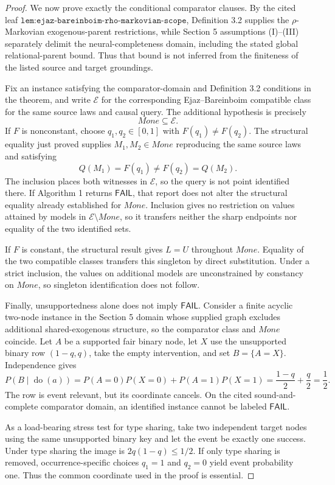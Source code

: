 \documentclass{article}
\begin{document}
\begin{proof}
We now prove exactly the conditional comparator clauses.  By the cited leaf \(\texttt{lem:ejaz-bareinboim-rho-markovian-scope}\), Definition 3.2 supplies the \(\rho\)-Markovian exogenous-parent restrictions, while Section 5 assumptions (I)--(III) separately delimit the neural-completeness domain, including the stated global relational-parent bound.  Thus that bound is not inferred from the finiteness of the listed source and target groundings.

Fix an instance satisfying the comparator-domain and Definition 3.2 conditions in the theorem, and write \(\mathcal E\) for the corresponding Ejaz--Bareinboim compatible class for the same source laws and causal query.  The additional hypothesis is precisely
\[
 Mone\subseteq\mathcal E.
\]
If \(F\) is nonconstant, choose \(q_1,q_2\in[0,1]\) with \(F(q_1)\neq F(q_2)\).  The structural equality just proved supplies \(M_1,M_2\in Mone\) reproducing the same source laws and satisfying
\[
 Q(M_1)=F(q_1)\neq F(q_2)=Q(M_2).
\]
The inclusion places both witnesses in \(\mathcal E\), so the query is not point identified there.  If Algorithm 1 returns \(\mathsf{FAIL}\), that report does not alter the structural equality already established for \(Mone\).  Inclusion gives no restriction on values attained by models in \(\mathcal E\setminus Mone\), so it transfers neither the sharp endpoints nor equality of the two identified sets.

If \(F\) is constant, the structural result gives \(L=U\) throughout \(Mone\).  Equality of the two compatible classes transfers this singleton by direct substitution.  Under a strict inclusion, the values on additional models are unconstrained by constancy on \(Mone\), so singleton identification does not follow.

Finally, unsupportedness alone does not imply \(\mathsf{FAIL}\).  Consider a finite acyclic two-node instance in the Section 5 domain whose supplied graph excludes additional shared-exogenous structure, so the comparator class and \(Mone\) coincide.  Let \(A\) be a supported fair binary node, let \(X\) use the unsupported binary row \((1-q,q)\), take the empty intervention, and set \(B=\{A=X\}\).  Independence gives
\[
 P(B\mid\operatorname{do}(a))
 =P(A=0)P(X=0)+P(A=1)P(X=1)
 =\frac{1-q}{2}+\frac q2=\frac12.
\]
The row is event relevant, but its coordinate cancels.  On the cited sound-and-complete comparator domain, an identified instance cannot be labeled \(\mathsf{FAIL}\).

As a load-bearing stress test for type sharing, take two independent target nodes using the same unsupported binary key and let the event be exactly one success.  Under type sharing the image is \(2q(1-q)\leq1/2\).  If only type sharing is removed, occurrence-specific choices \(q_1=1\) and \(q_2=0\) yield event probability one.  Thus the common coordinate used in the proof is essential.
\end{proof}
\end{document}
